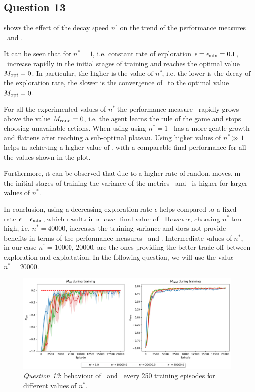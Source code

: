\documentclass[10pt]{IEEEtran}
\begin{document}
\subsection*{Question 13}
 shows the effect of the decay speed $n^{*}$ on the trend of the performance measures \mopt\  and \mrand. 

It can be seen that for $n^* = 1$, i.e. constant rate of exploration $\epsilon = \epsilon_{\text{min}} = 0.1$, \mopt\ increase rapidly in the initial stages of training and reaches the optimal value $M_{\text{opt}} = 0$. In particular, the higher is the value of $n^*$, i.e. the lower is the decay of the exploration rate, the slower is the convergence of \mopt\ to the optimal value  $M_{\text{opt}} = 0$. 

For all the experimented values of $n^*$ the performance measure \mrand\ rapidly grows above the value $M_{\text{rand}} = 0$, i.e. the agent learns the rule of the game and stops choosing unavailable actions. When using  using $n^* = 1$ \mrand\ has a more gentle growth and flattens after reaching a sub-optimal plateau. Using higher values of $n^* \gg 1$ helps in achieving a higher value of \mrand, with a comparable final performance for all the values shown in the plot.

Furthermore, it can be observed that due to a higher rate of random moves, in the initial stages of training the variance of the metrics \mopt\ and \mrand\ is higher for larger values of $n^*$.

In conclusion, using a decreasing exploration rate $\epsilon$ helps compared to a fixed rate $\epsilon = \epsilon_{\text{min}}$, which results in a lower final value of \mrand. However, choosing $n^*$ too high, i.e. $n^* = 40000$, increases the training variance and does not provide benefits in terms of the performance measures \mopt\ and \mrand. Intermediate values of $n^*$, in our case $n^*=10000,\,20000$, are the ones providing the better trade-off between exploration and exploitation. In the following question, we will use the value $n^* = 20000$. 

\begin{figure}[h]
    \centering
    \includegraphics[width = \linewidth]{code/figures/performance_dqn_n_star.pdf}
    \caption{\emph{Question 13}: behaviour of \mopt\  and \mrand\  every 250 training episodes for different values of $n^{*}$.}
    \label{plot_question13}
\end{figure}
\end{document}

